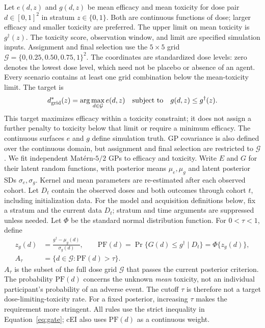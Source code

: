 \documentclass[11pt]{article}
\newcommand{\rev}[1]{{#1}}
\newcommand{\PF}{\mathrm{PF}}
\begin{document}
\rev{Let $e(d,z)$ and $g(d,z)$ be mean efficacy and mean toxicity for dose pair $d\in[0,1]^2$ in stratum $z\in\{0,1\}$. Both are continuous functions of dose; larger efficacy and smaller toxicity are preferred.} The upper limit on mean toxicity is $g^\dagger(z)$. \rev{The toxicity score, observation window, and limit are specified simulation inputs.} Assignment and final selection use the $5\times5$ grid $\mathcal G=\{0,0.25,0.50,0.75,1\}^2$. The coordinates are standardized dose levels: \rev{zero denotes the lowest dose level, which need not be placebo or absence of an agent}. Every scenario contains at least one grid combination below the mean-toxicity limit. The target is
\begin{equation}\label{eq:obd_grid}
d^*_{\rm grid}(z)=\arg\max_{d\in\mathcal G}e(d,z)\quad\text{subject to}\quad g(d,z)\le g^\dagger(z).
\end{equation}
This target maximizes efficacy within a toxicity constraint; it does not assign a further penalty to toxicity below that limit or require a minimum efficacy. \rev{The continuous surfaces $e$ and $g$ define simulation truth. GP covariance is also defined over the continuous domain, but assignment and final selection are restricted to $\mathcal G$.} We fit independent Mat\'ern-$5/2$ GPs to efficacy and toxicity. Write $E$ and $G$ for their latent random functions, with posterior means $\mu_e,\mu_g$ and \rev{latent posterior SDs} $\sigma_e,\sigma_g$. Kernel and mean parameters are re-estimated after each observed cohort. \rev{Let $D_t$ contain the observed doses and both outcomes through cohort $t$, including initialization data. For the model and acquisition definitions below, fix a stratum and the current data $D_t$; stratum and time arguments are suppressed unless needed.} Let $\Phi$ be the standard normal distribution function. For $0<\tau<1$, define
\begin{equation}\label{eq:gate}
\begin{aligned}
z_g(d)&=\frac{g^\dagger-\mu_g(d)}{\sigma_g(d)},\qquad
\PF(d)=\Pr\{G(d)\le g^\dagger\mid D_t\}=\Phi\{z_g(d)\},\\
\rev{A_\tau}&\rev{=\{d\in\mathcal G:\PF(d)>\tau\}.}
\end{aligned}
\end{equation}
\rev{$A_\tau$ is the subset of the full dose grid $\mathcal G$ that passes the current posterior criterion.} The probability $\PF(d)$ concerns the unknown \emph{mean} toxicity, not an individual participant's probability of an adverse event. The cutoff $\tau$ is therefore not a target dose-limiting-toxicity rate. For a fixed posterior, increasing $\tau$ makes the requirement more stringent. All rules use the strict inequality in Equation~\eqref{eq:gate}; cEI also uses $\PF(d)$ as a continuous weight.
\end{document}
